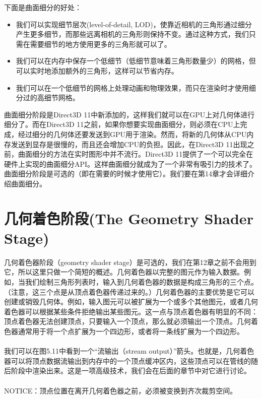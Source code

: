 \begin{flushleft}
下面是曲面细分的好处：
\begin{itemize}
    \item 我们可以实现细节层次(level-of-detail, LOD)，使靠近相机的三角形通过细分产生更多细节，而那些远离相机的三角形则保持不变。通过这种方式，我们只需在需要细节的地方使用更多的三角形就可以了。
    \item 我们可以在内存中保存一个低细节（低细节意味着三角形数量少）的网格，但可以实时地添加额外的三角形，这样可以节省内存。
    \item 我们可以在一个低细节的网格上处理动画和物理效果，而只在渲染时才使用细分过的高细节网格。
\end{itemize}
曲面细分阶段是Direct3D 11中新添加的，这样我们就可以在GPU上对几何体进行细分了。而在Direct3D 11之前，如果你想要实现曲面细分，则必须在CPU上完成，经过细分的几何体还要发送到GPU用于渲染。然而，将新的几何体从CPU内存发送到显存是很慢的，而且还会增加CPU的负担。因此，在Direct3D 11出现之前，曲面细分的方法在实时图形中并不流行。Direct3D 11提供了一个可以完全在硬件上实现的曲面细分API。这样曲面细分就成为了一个非常有吸引力的技术了。曲面细分阶段是可选的（即在需要的时候才使用它）。我们要在第14章才会详细介绍曲面细分。
\end{flushleft}

\section{几何着色阶段(The Geometry Shader Stage)}
\begin{flushleft}
几何着色器阶段（geometry shader stage）是可选的，我们在第12章之前不会用到它，所以这里只做一个简短的概述。几何着色器以完整的图元作为输入数据。例如，当我们绘制三角形列表时，输入到几何着色器的数据是构成三角形的三个点。（注意，这三个点是从顶点着色器传递过来的。）几何着色器的主要优势是它可以创建或销毁几何体。例如，输入图元可以被扩展为一个或多个其他图元，或者几何着色器可以根据某些条件拒绝输出某些图元。这一点与顶点着色器有明显的不同：顶点着色器无法创建顶点，只要输入一个顶点，那么就必须输出一个顶点。几何着色器通常用于将一个点扩展为一个四边形，或者将一条线扩展为一个四边形。\\
~\\
我们可以在图5.11中看到一个“流输出（stream output）”箭头。也就是，几何着色器可以将顶点数据流输出到内存中的一个顶点缓冲区内，这些顶点可以在管线的随后阶段中渲染出来。这是一项高级技术，我们会在后面的章节中对它进行讨论。\\
~\\
NOTICE：顶点位置在离开几何着色器之前，必须被变换到齐次裁剪空间。
\end{flushleft}


